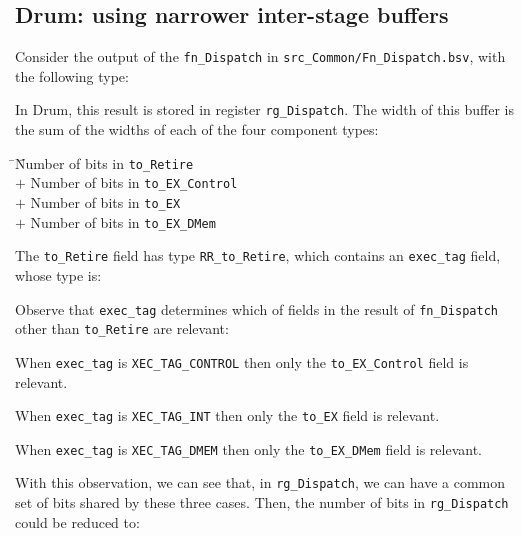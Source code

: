 
\subsection{Drum: using narrower inter-stage buffers}

Consider the output of the \verb|fn_Dispatch| in
\verb|src_Common/Fn_Dispatch.bsv|, with the following type:



In Drum, this result is stored in register \verb|rg_Dispatch|.  The
width of this buffer is the sum of the widths of each of the four
component types:

\begin{tabbing}
\hmm \= \hmm \= Number of bits in {\tt to\_Retire} \\
     \> $+$  \> Number of bits in {\tt to\_EX\_Control} \\
     \> $+$  \> Number of bits in {\tt to\_EX} \\
     \> $+$  \> Number of bits in {\tt to\_EX\_DMem}
\end{tabbing}

The \verb|to_Retire| field has type \verb|RR_to_Retire|, which
contains an \verb|exec_tag| field, whose type is:



Observe that \verb|exec_tag| determines which of fields in the result
of \verb|fn_Dispatch| other than \verb|to_Retire| are relevant:

\begin{tightlist}

 \item When \verb|exec_tag| is \verb|XEC_TAG_CONTROL| then
       only the \verb|to_EX_Control| field is relevant.

 \item When \verb|exec_tag| is \verb|XEC_TAG_INT| then
       only the \verb|to_EX| field is relevant.

 \item When \verb|exec_tag| is \verb|XEC_TAG_DMEM| then
       only the \verb|to_EX_DMem| field is relevant.

\end{tightlist}

With this observation, we can see that, in \verb|rg_Dispatch|, we can
have a common set of bits shared by these three cases.  Then, the
number of bits in \verb|rg_Dispatch| could be reduced to:


